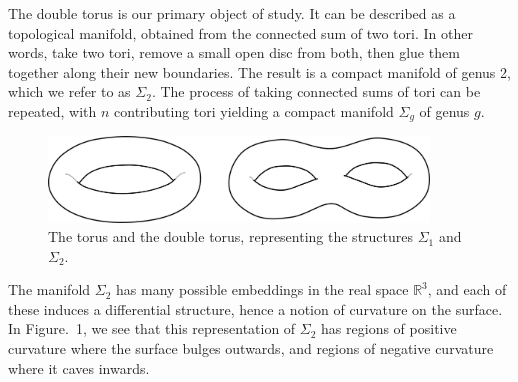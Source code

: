 \documentclass[12pt]{article}
\newcommand{\R}{\mathbb{R}}
\theoremstyle{definition}
\theoremstyle{remark}
\begin{document}
    The double torus is our primary object of study. It can be described as a
    topological manifold, obtained from the connected sum of two tori. In other
    words, take two tori, remove a small open disc from both, then glue them together
    along their new boundaries. The result is a compact manifold of genus 2, which we
    refer to as $\Sigma_2$. The process of taking connected sums of tori can be
    repeated, with $n$ contributing tori yielding a compact manifold $\Sigma_g$ of
    genus $g$.

    \begin{figure}[H]
        \begin{center}
            \includegraphics[width=0.9\textwidth]{figures/tori.png}
        \end{center}
        \caption{The torus and the double torus, representing the structures
        $\Sigma_1$ and $\Sigma_2$.}
        \label{fig:tori}
    \end{figure}

    The manifold $\Sigma_2$ has many possible embeddings in the real space $\R^3$,
    and each of these induces a differential structure, hence a notion of curvature
    on the surface. In Figure.~1, we see that this representation of $\Sigma_2$ has
    regions of positive curvature where the surface bulges outwards, and regions of
    negative curvature where it caves inwards. 
\end{document}
